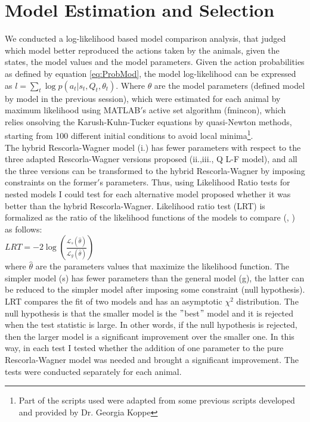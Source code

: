 \section{Model Estimation and Selection}
\label{sec:Behavior}
We conducted a log-likelihood based model comparison analysis, that judged which model better reproduced the actions taken by the animals, given the states, the model values and the model parameters. Given the action probabilities as defined by equation \ref{eq:ProbMod}, the model log-likelihood can be expressed as $l=\sum_{t} \log p(a_t|s_t,Q_t,\theta_t)$. Where $\theta$ are the model parameters (defined model by model in the previous session), which were estimated for each animal by maximum likelihood using MATLAB$'$s active set algorithm (fmincon), which relies onsolving the Karush-Kuhn-Tucker equations by quasi-Newton methods, starting from 100 different initial conditions to avoid local minima\footnote{Part of the scripts used were adapted from some previous scripts developed and provided by Dr. Georgia Koppe}.\\The hybrid Rescorla-Wagner model (i.) has fewer parameters with respect to the three adapted Rescorla-Wagner versions proposed (ii.,iii., Q L-F model), and all the three versions can be transformed to the hybrid Rescorla-Wagner by imposing constraints on the former$'$s parameters. Thus, using Likelihood Ratio tests for nested models I could test for each alternative model proposed whether it was better than the hybrid Rescorla-Wagner. Likelihood ratio test (LRT) is formalized as the ratio of the likelihood functions of the models to compare (\cite{NeymanPearson}, \cite{King}) as follows:\\
 \hspace{5cm} $LRT = -2 \log (\frac{\mathcal{L}_s(\hat{\theta})}{\mathcal{L}_g(\hat{\theta})})$\\
where $\hat{\theta}$ are the parameters values that maximize the likelihood function.
The simpler model (s) has fewer parameters than the general model (g), the latter can be reduced to the simpler model after imposing some constraint (null hypothesis).\\LRT compares the fit of two models and has an asymptotic $\chi^2$ distribution. The null hypothesis is that the smaller model is the $"$best$"$ model and it is rejected when the test statistic is large. In other words, if the null hypothesis is rejected, then the larger model is a significant improvement over the smaller one. In this way, in each test I tested whether the addition of one parameter to the pure Rescorla-Wagner model was needed and brought a significant improvement. The tests were conducted separately for each animal.
